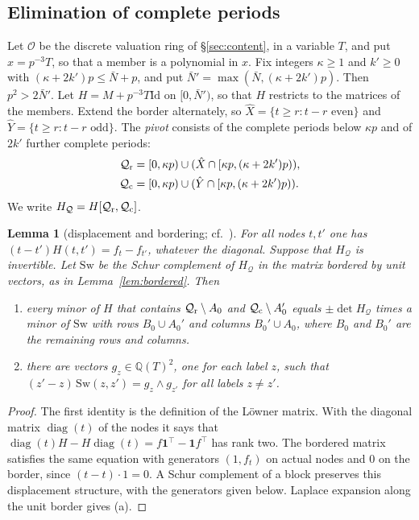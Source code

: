 \documentclass[11pt]{amsart}
\newtheorem{lemma}[theorem]{Lemma}
\theoremstyle{definition}
\theoremstyle{remark}
\numberwithin{equation}{section}
\newcommand{\Q}{\mathbb Q}
\newcommand{\cO}{\mathcal O}
\newcommand{\Id}{\mathrm{Id}}
\begin{document}
\subsection{Elimination of complete periods}
Let $\cO$ be the discrete valuation ring of \S\ref{sec:content}, in a variable $T$, and put $x=p^{-3}T$,
so that a member is a polynomial in $x$. Fix integers $\kappa\ge1$ and $k'\ge0$ with $(\kappa+2k')p\le\bar N+p$, and put
$\bar N'=\max(\bar N,(\kappa+2k')p)$. Then $p^2>2\bar N'$. Let $H=M+p^{-3}T\Id$ on $[0,\bar N')$, so that
$H$ restricts to the matrices of the members. Extend the border alternately, so
$\hat X=\{t\ge r:t-r\text{ even}\}$ and $\hat Y=\{t\ge r:t-r\text{ odd}\}$. The \emph{pivot} consists of the complete
periods below $\kappa p$ and of $2k'$ further complete periods:
\begin{align*}
 \mathcal Q_{\rm r}&=[0,\kappa p)\cup(\hat X\cap[\kappa p,(\kappa+2k')p)),\\
 \mathcal Q_{\rm c}&=[0,\kappa p)\cup(\hat Y\cap[\kappa p,(\kappa+2k')p)).
\end{align*}
We write $H_{\mathcal Q}=H[\mathcal Q_{\rm r},\mathcal Q_{\rm c}]$.

\begin{lemma}[displacement and bordering; cf.\ \cite{Fiedler84}]\label{lem:displace}
For all nodes $t,t'$ one has $(t-t')H(t,t')=f_t-f_{t'}$, whatever the diagonal. Suppose that $H_{\mathcal Q}$
is invertible. Let $\mathrm{Sw}$ be the Schur complement of $H_{\mathcal Q}$ in the matrix bordered by unit
vectors, as in Lemma~\ref{lem:bordered}. Then
\begin{enumerate}[label=(\alph*),leftmargin=*]
\item every minor of $H$ that contains $\mathcal Q_{\rm r}\setminus A_0$ and $\mathcal Q_{\rm c}\setminus A_0'$ equals
 $\pm\det H_{\mathcal Q}$ times a minor of $\mathrm{Sw}$ with rows $B_0\cup A_0'$ and columns
 $B_0'\cup A_0$, where $B_0$ and $B_0'$ are the remaining rows and columns.
\item there are vectors $g_z\in\Q(T)^2$, one for each label $z$, such that
 $(z'-z)\,\mathrm{Sw}(z,z')=g_z\wedge g_{z'}$ for all labels $z\ne z'$.
\end{enumerate}
\end{lemma}
\begin{proof}
The first identity is the definition of the L\"owner matrix. With the diagonal matrix $\operatorname{diag}(t)$ of the
nodes it says that $\operatorname{diag}(t)H-H\operatorname{diag}(t)=f\mathbf 1^\top-\mathbf
1f^\top$ has rank two. The bordered matrix satisfies the same equation with generators $(1,f_t)$ on actual nodes
and $0$ on the border, since $(t-t)\cdot1=0$. A Schur complement of a block preserves this displacement structure, with
the generators given below. Laplace expansion along the unit border gives (a).
\end{proof}
\end{document}

